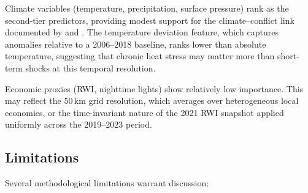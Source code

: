 \documentclass[11pt,a4paper]{article}
\begin{document}
Climate variables (temperature, precipitation, surface pressure) rank as the second-tier predictors, providing modest support for the climate--conflict link documented by \textcite{burke2009warming} and \textcite{hsiang2013quantifying}. The temperature deviation feature, which captures anomalies relative to a 2006--2018 baseline, ranks lower than absolute temperature, suggesting that chronic heat stress may matter more than short-term shocks at this temporal resolution.

Economic proxies (RWI, nighttime lights) show relatively low importance. This may reflect the $50\,\mathrm{km}$ grid resolution, which averages over heterogeneous local economies, or the time-invariant nature of the 2021 RWI snapshot applied uniformly across the 2019--2023 period.

\subsection{Limitations}
\label{sec:limitations}

Several methodological limitations warrant discussion:
\end{document}
